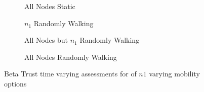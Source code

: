 \begin{figure}
\begin{subfigure}{0.5\textwidth}
  \centering
  \caption{All Nodes Static}
  \label{fig:beta_trust_static}
\end{subfigure}%
\begin{subfigure}{0.5\textwidth}
  \centering
  \caption{$n_1$ Randomly Walking}
  \label{fig:beta_trust_single}
\end{subfigure}%

\begin{subfigure}{0.5\textwidth}
\centering
  \caption{All Nodes but $n_1$ Randomly Walking}
  \label{fig:beta_trust_allbut1}
\end{subfigure}%
\begin{subfigure}{0.5\textwidth}
\centering
  \caption{All Nodes Randomly Walking}
  \label{fig:beta_trust_all_mobile}
\end{subfigure}
\caption{Beta Trust time varying assessments for of $n1$ varying mobility options}
\label{fig:trust_mobility}
\end{figure}




\ifx\ifthesis\undefined
	
\else
\fi
